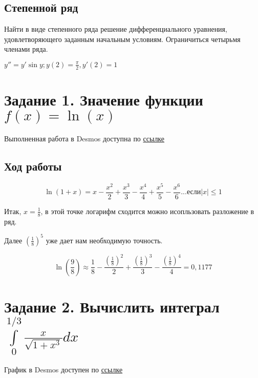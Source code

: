 \documentclass[fleqn]{article}
\renewcommand{\thesubsection}{Задание \arabic{subsection}.}
\begin{document}
\subsection{Степенной ряд}

Найти в виде степенного ряда решение дифференциального уравнения, удовлетворяющего заданным начальным условиям. Ограничиться четырьмя членами ряда. 

\begin{center}
    $y'' = y'\sin{y};   y(2) = \frac{\pi}{2}, y'(2) = 1$
\end{center}

\renewcommand{\thesubsection}{\arabic{subsection}.}


\section{Задание 1. Значение функции $f(x) = \ln(x)$}

Выполненная работа в Desmos доступна по 
\href{https://www.desmos.com/calculator/bubpcmb9ie}{ссылке}

\subsection*{Ход работы}

\[
\ln{(1+x)} = x - \frac{x^2}{2} + \frac{x^3}{3} - \frac{x^4}{4} + \frac{x^5}{5} - \frac{x^6}{6} ... \text{если} |x| \leq 1
\]

Итак, $x = \frac{1}{8}$, в этой точке логарифм сходится \Rightarrow можно исопльзовать разложение в ряд.

Далее $\left(\frac{1}{8}\right)^5$ уже дает нам необходимую точность.

\[
\ln{\left(\frac{9}{8}\right)} \approx \frac{1}{8} - \frac{\left(\frac{1}{8}\right)^2}{2} + \frac{\left(\frac{1}{8}\right)^3}{3} - \frac{\left(\frac{1}{8}\right)^4}{4} = 0,1177
\]

\section{Задание 2. Вычислить интеграл $\int\limits_{0}^{1/3} \frac{x}{\sqrt{1+x^3}}dx$}

График в Desmos доступен по
\href{https://www.desmos.com/calculator/9n57v4dodl}{ссылке}
\end{document}
